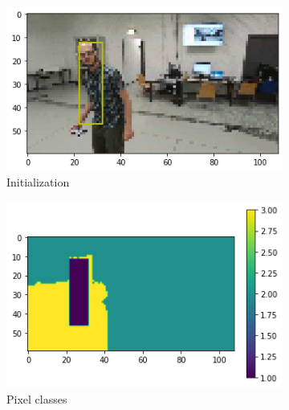 \begin{figure}[!h]
	\begin{center}
		\begin{subfigure}[h]{0.24\textwidth}
			\centering
			\includegraphics[width=1\textwidth]{"contents/images/04-2grabcut-2mask-steps-1"}
			\caption[]{Initialization}
			\label{fig:grabcut-mask-explain-1}
		\end{subfigure}
		\hfill
		\begin{subfigure}[h]{0.24\textwidth}
			\centering
			\includegraphics[width=1\textwidth]{"contents/images/04-2grabcut-2mask-steps-2"}
			\caption[]{Pixel classes}
			\label{fig:grabcut-mask-explain-2}
		\end{subfigure}
		\hfill
		\begin{subfigure}[h]{0.24\textwidth}
			\centering

\end{subfigure}
\end{center}
\end{figure}
